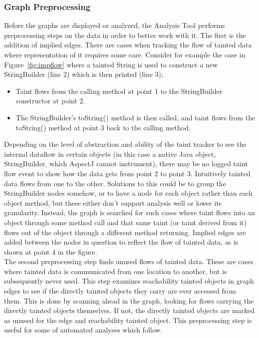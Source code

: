 \documentclass[msc,oneside]{ubcthesis}
\begin{document}
\subsubsection{Graph Preprocessing}
\label{subsub:impliededges}
Before the graphs are displayed or analyzed, the Analysis Tool performs preprocessing steps on the data in order to better work with it. The first is the addition of implied edges. There are cases when tracking the flow of tainted data where representation of it requires some care. Consider for example the case in Figure~\ref{fig:impflow} where a tainted String is used to construct a new StringBuilder (line 2) which is then printed (line 3); 
\begin{itemize}
\item Taint flows from the calling method at point 1 to the StringBuilder constructor at point 2.
\item The StringBuilder's toString() method is then called, and taint flows from the toString() method at point 3 back to the calling method.
\end{itemize}
Depending on the level of abstraction and ability of the taint tracker to see the internal dataflow in certain objects (in this case a native Java object, StringBuilder, which AspectJ cannot instrument), there may be no logged taint flow event to show how the data gets from point 2 to point 3. Intuitively tainted data flows from one to the other. Solutions to this could be to group the StringBuilder nodes somehow, or to have a node for each object rather than each object method, but these either don't support analysis well or lower its granularity. Instead, the graph is searched for such cases where taint flows into an object through some method call and that same taint (or taint derived from it) flows out of the object through a different method returning. Implied edges are added between the nodes in question to reflect the flow of tainted data, as is shown at point 4 in the figure.\\

The second preprocessing step finds unused flows of tainted data. These are cases where tainted data is communicated from one location to another, but is subsequently never used. This step examines reachability tainted objects in graph edges to see if the directly tainted objects they carry are ever accessed from them. This is done by scanning ahead in the graph, looking for flows carrying the directly tainted objects themselves. If not, the directly tainted objects are marked as unused for the edge and reachability tainted object. This preprocessing step is useful for some of automated analyses which follow.
\end{document}
